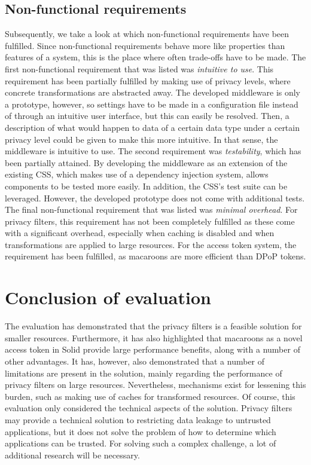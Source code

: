 \subsection{Non-functional requirements}
Subsequently, we take a look at which non-functional requirements have been fulfilled. Since non-functional requirements behave more like properties than features of a system, this is the place where often trade-offs have to be made. The first non-functional requirement that was listed was \textit{intuitive to use}. This requirement has been partially fulfilled by making use of privacy levels, where concrete transformations are abstracted away. The developed middleware is only a prototype, however, so settings have to be made in a configuration file instead of through an intuitive user interface, but this can easily be resolved. Then, a description of what would happen to data of a certain data type under a certain privacy level could be given to make this more intuitive. In that sense, the middleware is intuitive to use. The second requirement was \textit{testability}, which has been partially attained. By developing the middleware as an extension of the existing \gls{CSS}, which makes use of a dependency injection system, allows components to be tested more easily. In addition, the \gls{CSS}'s test suite can be leveraged. However, the developed prototype does not come with additional tests. The final non-functional requirement that was listed was \textit{minimal overhead}. For privacy filters, this requirement has not been completely fulfilled as these come with a significant overhead, especially when caching is disabled and when transformations are applied to large resources. For the access token system, the requirement has been fulfilled, as macaroons are more efficient than \gls{DPoP} tokens.

\section{Conclusion of evaluation}
The evaluation has demonstrated that the privacy filters is a feasible solution for smaller resources. Furthermore, it has also highlighted that macaroons as a novel access token in Solid provide large performance benefits, along with a number of other advantages. It has, however, also demonstrated that a number of limitations are present in the solution, mainly regarding the performance of privacy filters on large resources. Nevertheless, mechanisms exist for lessening this burden, such as making use of caches for transformed resources. Of course, this evaluation only considered the technical aspects of the solution. Privacy filters may provide a technical solution to restricting data leakage to untrusted applications, but it does not solve the problem of how to determine which applications can be trusted. For solving such a complex challenge, a lot of additional research will be necessary. 
